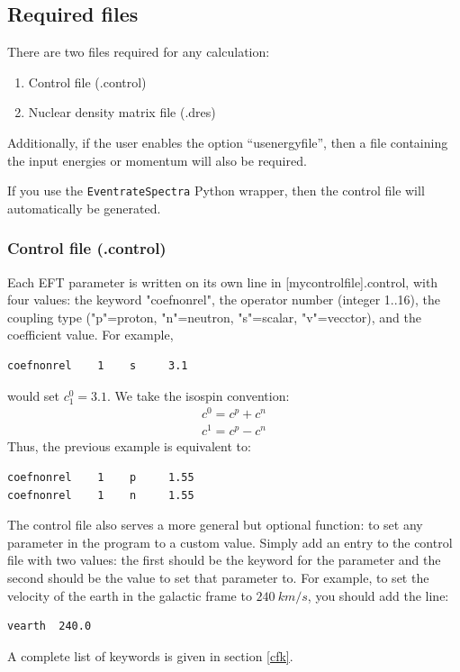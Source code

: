 \documentclass[
14pt, %
a4paper, %
oneside, %
headinclude,footinclude, %
BCOR5mm, %
]{scrartcl}
\begin{document}
\subsection{Required files}
There are two files required for any calculation:
\begin{enumerate}
    \item Control file (.control)
    \item Nuclear density matrix file (.dres)
\end{enumerate}
Additionally, if the user enables the option ``usenergyfile'', then a file
containing the input energies or momentum will also be required.

If you use the {\tt EventrateSpectra} Python wrapper, then the control file will
automatically be generated.

\subsubsection{Control file (.control)}
Each EFT parameter is written on its own line in [mycontrolfile].control, with
four values: the keyword "coefnonrel", the operator number (integer 1..16), the
coupling type ("p"=proton, "n"=neutron, "s"=scalar, "v"=vecctor), and the
coefficient value. For example, 
\begin{verbatim}
coefnonrel    1    s     3.1
\end{verbatim}
would set $c_1^0 = 3.1$. We take the isospin convention:
\begin{equation}
	\begin{split}
		c^0 = c^p + c^n\\
		c^1 = c^p - c^n
	\end{split}
\end{equation}
Thus, the previous example is equivalent to:
\begin{verbatim}
coefnonrel    1    p     1.55
coefnonrel    1    n     1.55
\end{verbatim}

The control file also serves a more general but optional function: to set any
parameter in the program to a custom value.  Simply add an entry to the control
file with two values: the first should be the keyword for the parameter and the
second should be the value to set that parameter to. For example, to set the
velocity of the earth in the galactic frame to $240\ km/s$, you should add the
line:
\begin{verbatim}
vearth  240.0
\end{verbatim}
A complete list of keywords is given in section \ref{cfk}.
\end{document}
